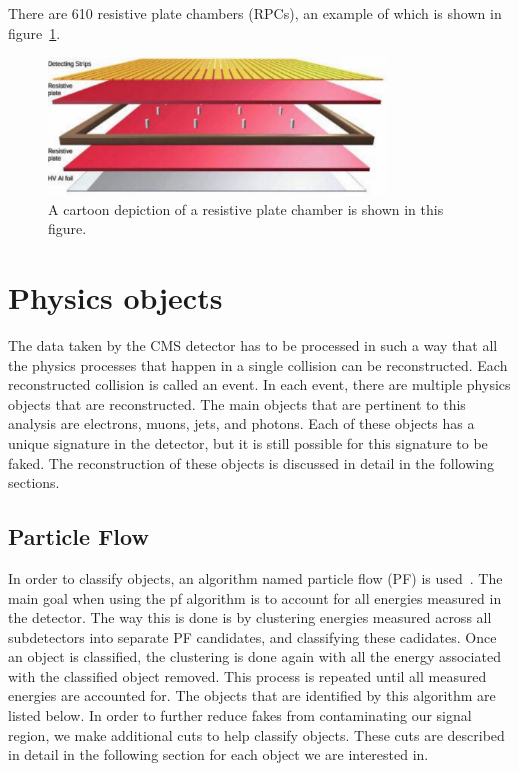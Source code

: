 There are 610 resistive plate chambers (RPCs), an example of which is shown in figure~\ref{fig:RPC}.

\begin{figure}[!htb]
  \begin{center}
    \includegraphics[width=0.8\textwidth]{cms/figs/RPClayers.pdf}
    \caption{
      \label{fig:RPC}
      A cartoon depiction of a resistive plate chamber is shown in this figure. 
    }
  \end{center}
\end{figure}


\section{Physics objects}
The data taken by the CMS detector has to be processed in such a way that all the physics processes that happen in a single collision can be reconstructed.
Each reconstructed collision is called an event.
In each event, there are multiple physics objects that are reconstructed.
The main objects that are pertinent to this analysis are electrons, muons, jets, and photons.
Each of these objects has a unique signature in the detector, but it is still possible for this signature to be faked.
The reconstruction of these objects is discussed in detail in the following sections.

\subsection{Particle Flow}
\label{subs:particleflow}
In order to classify objects, an algorithm named particle flow (PF) is used~\cite{pfReco}. 
The main goal when using the pf algorithm is to account for all energies measured in the detector.
The way this is done is by clustering energies measured across all subdetectors into separate PF candidates, and classifying these cadidates.
Once an object is classified, the clustering is done again with all the energy associated with the classified object removed.
This process is repeated until all measured energies are accounted for.
The objects that are identified by this algorithm are listed below.
In order to further reduce fakes from contaminating our signal region, we make additional cuts to help classify objects.
These cuts are described in detail in the following section for each object we are interested in.


